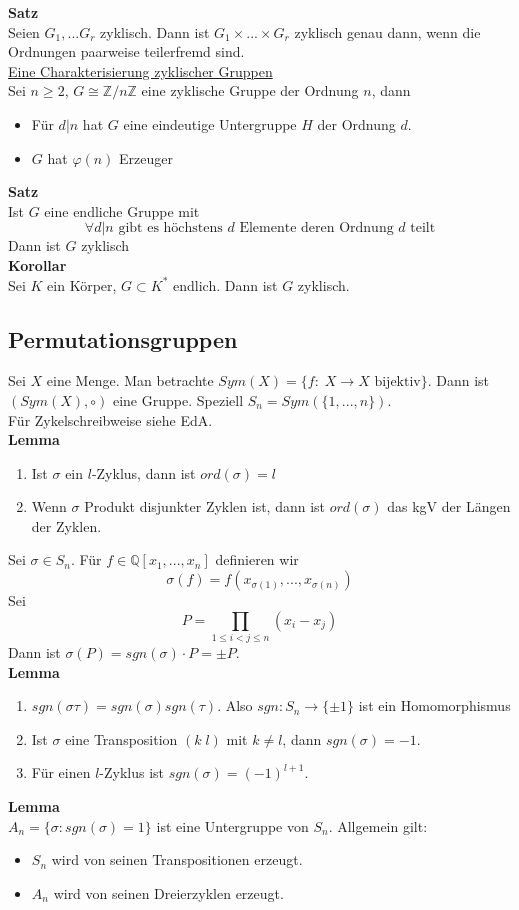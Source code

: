 \documentclass[a4paper, 12pt]{article}
\begin{document}
\textbf{Satz}\\
Seien $G_1, ... G_r$ zyklisch. Dann ist $G_1 \times ... \times G_r$ zyklisch genau dann, wenn die Ordnungen paarweise teilerfremd sind.\\
\underline{Eine Charakterisierung zyklischer Gruppen}\\
Sei $n\geq 2$, $G\cong \mathbb{Z}/n\mathbb{Z}$ eine zyklische Gruppe der Ordnung $n$, dann \begin{itemize}
	\item Für $d|n$ hat $G$ eine eindeutige Untergruppe $H$ der Ordnung $d$. 
	\item $G$ hat $\varphi(n)$ Erzeuger 
\end{itemize}
\textbf{Satz}\\
Ist $G$ eine endliche Gruppe mit \[\forall d|n \text{ gibt es höchstens $d$ Elemente deren Ordnung $d$ teilt}\]
Dann ist $G$ zyklisch\\
\textbf{Korollar}\\
Sei $K$ ein Körper, $G\subset K^*$ endlich. Dann ist $G$ zyklisch. 
\subsection{Permutationsgruppen}
Sei $X$ eine Menge. Man betrachte $Sym(X) = \{f: \; X\to X \text{ bijektiv}\}$. Dann ist $(Sym(X), \circ)$ eine Gruppe. Speziell $S_n = Sym(\{1,...,n\})$.\\
Für Zykelschreibweise siehe EdA.\\
\textbf{Lemma}
\begin{enumerate}
	\item Ist $\sigma$ ein $l$-Zyklus, dann ist $ord(\sigma) = l$
	\item Wenn $\sigma$ Produkt disjunkter Zyklen ist, dann ist $ord(\sigma)$ das kgV der Längen der Zyklen.
\end{enumerate}
Sei $\sigma \in S_n$. Für $f \in \mathbb{Q}[x_1,...,x_n]$ definieren wir \[\sigma(f) = f(x_{\sigma(1)},...,x_{\sigma(n)})\]
Sei \[P = \prod_{1\leq i < j \leq n}(x_i-x_j)\] Dann ist $\sigma(P) = sgn(\sigma)\cdot P = \pm P$.\\
\textbf{Lemma}
\begin{enumerate}
	\item $sgn(\sigma \tau) = sgn(\sigma) sgn(\tau)$. Also $sgn: S_n \to \{\pm1\}$ ist ein Homomorphismus
	\item Ist $\sigma$ eine Transposition $(k\;l)$ mit $k\neq l$, dann $sgn(\sigma) = -1$.
	\item Für einen $l$-Zyklus ist $sgn(\sigma) = (-1)^{l+1}$.
\end{enumerate}
\textbf{Lemma}\\
$A_n = \{\sigma: sgn(\sigma) = 1\}$ ist eine Untergruppe von $S_n$.
Allgemein gilt: \begin{itemize}
	\item $S_n$ wird von seinen Transpositionen erzeugt.
	\item $A_n$ wird von seinen Dreierzyklen erzeugt.
\end{itemize}
\end{document}
